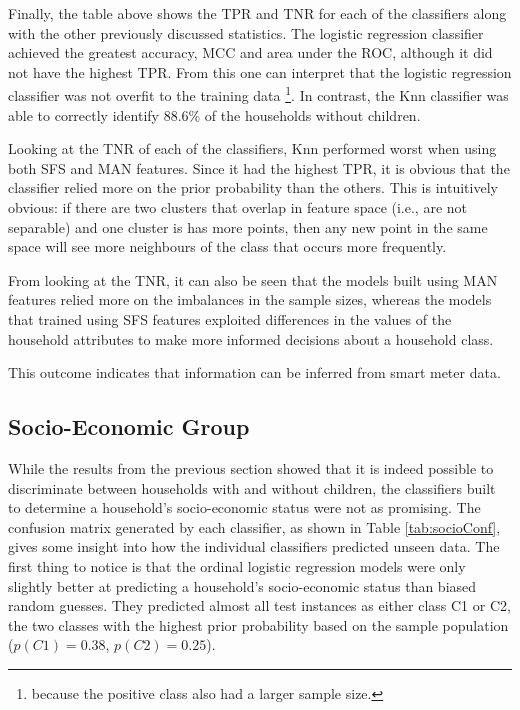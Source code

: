 \childResults

Finally, the table above shows the TPR and TNR for each of the classifiers along with the other previously discussed statistics. The logistic regression classifier achieved the greatest accuracy, MCC and area under the ROC, although it did not have the highest TPR.  From this one can interpret that the logistic regression classifier was not overfit to the training data \footnote{because the positive class also had a larger sample size.}.  In contrast, the Knn classifier was able to correctly identify 88.6\% of the households without children. 

Looking at the TNR of each of the classifiers, Knn performed worst when using both SFS and MAN features. Since it had the highest TPR, it is obvious that the classifier relied more on the prior probability than the others. This is intuitively obvious: if there are two clusters that overlap in feature space (i.e., are not separable) and one cluster is has more points, then any new point in the same space will see more neighbours of the class that occurs more frequently. 

From looking at the TNR, it can also be seen that the models built using MAN features relied more on the imbalances in the sample sizes, whereas the models that trained using SFS features exploited differences in the values of the household attributes to make more informed decisions about a household class. 

This outcome indicates that information can be inferred from smart meter data.

 
\subsection{Socio-Economic Group}


While the results from the previous section showed that it is indeed possible to discriminate between households with and without children, the classifiers built to determine a household's socio-economic status were not as promising.  The confusion matrix generated by each classifier, as shown in Table \ref{tab:socioConf}, gives some insight into how the individual classifiers predicted unseen data. The first thing to notice is that the ordinal logistic regression models were only slightly better at predicting a household's socio-economic status than biased random guesses. They predicted almost all test instances as either class C1 or C2, the two classes with the highest prior probability based on the sample population ($p(C1)=0.38$, $p(C2)=0.25$).  

